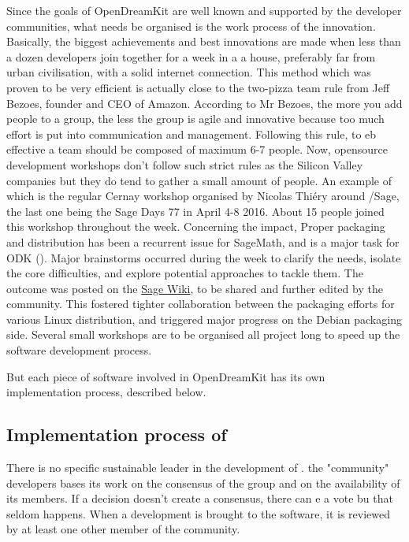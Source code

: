 \documentclass{deliverablereport}
\begin{document}
Since the goals of OpenDreamKit are well known and supported by the developer communities, what needs be organised is the work process of the innovation. Basically, the biggest achievements and best innovations are made when less than a dozen developers join together for a week in a a house, preferably far from urban civilisation, with a solid internet connection. This method which was proven to be very efficient is actually close to the two-pizza team rule from Jeff Bezoes, founder and CEO of Amazon. According to Mr Bezoes, the more you add people to a group, the less the group is agile and innovative because too much effort is put into communication and management. Following this rule, to eb effective a team should be composed of maximum 6-7 people.
Now, opensource development workshops don't follow such strict rules as the Silicon Valley companies but they do tend to gather a small amount of people. An example of which is the regular Cernay workshop organised by Nicolas Thiéry around /Sage, the last one being the Sage Days 77 in April 4-8 2016. About 15 people joined this workshop throughout the week. Concerning the impact, Proper packaging and distribution has been a recurrent issue for SageMath, and is a major task for ODK (). Major brainstorms occurred during the week to clarify the needs, isolate the core difficulties, and explore potential approaches to tackle them. The outcome was posted on the \href{https://wiki.sagemath.org/days77/packaging}{Sage Wiki}, to be shared and further edited by the community. This fostered tighter collaboration between the packaging efforts for various Linux distribution, and triggered major progress on the Debian packaging side.
Several small workshops are to be organised all project long to speed up the software development process.

But each piece of software involved in OpenDreamKit has its own implementation process, described below.

\subsection{Implementation process of \Sage}

There is no specific sustainable leader in the development of \Sage. the "community" \Sage developers bases its work on the consensus of the group and on the availability of its members. If a decision doesn't create a consensus, there can e a vote bu that seldom happens. 
When a development is brought to the software, it is reviewed by at least one other member of the community.
\end{document}

